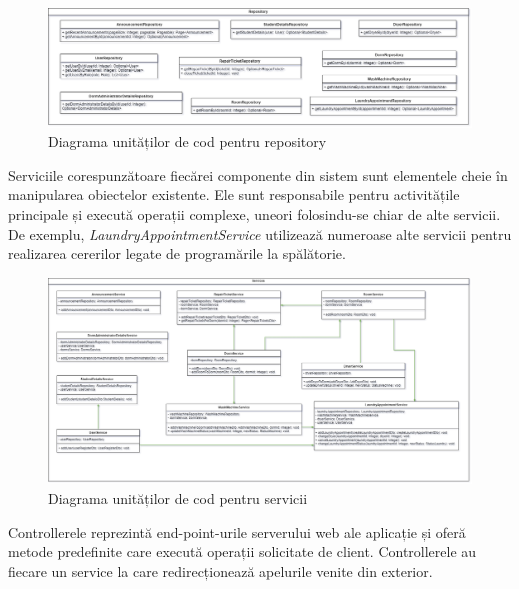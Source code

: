\documentclass[12pt,a4paper]{report}
\theoremstyle{definition}
\theoremstyle{remark}
\begin{document}
\begin{figure}[H]
    \centering
    \includegraphics[width=1\linewidth]{resurse/diagrame/uvtdorms_d2.drawio.png}
    \caption{Diagrama unităților de cod pentru repository}
\end{figure}

\par Serviciile corespunzătoare fiecărei componente din sistem sunt elementele cheie în manipularea obiectelor existente. Ele sunt responsabile pentru activitățile principale și execută operații complexe, uneori folosindu-se chiar de alte servicii. De exemplu, {\itshape LaundryAppointmentService} utilizează numeroase alte servicii pentru realizarea cererilor legate de programările la spălătorie.

\begin{figure}[H]
    \centering
    \includegraphics[width=1\linewidth]{resurse/diagrame/uvtdorms_d3.drawio.png}
    \caption{Diagrama unităților de cod pentru servicii}
\end{figure}

\par Controllerele reprezintă end-point-urile serverului web ale aplicație și oferă metode predefinite care execută operații solicitate de client. Controllerele au fiecare un service la care redirecționează apelurile venite din exterior.
\end{document}
